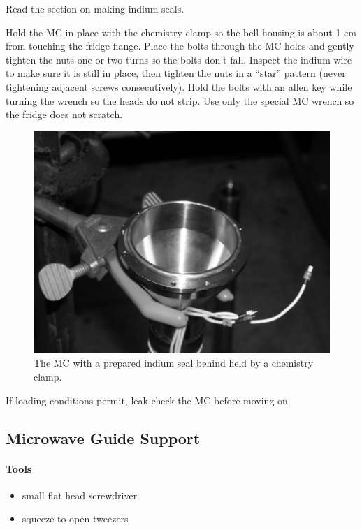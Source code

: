 Read the section on making indium seals.

Hold the MC in place with the chemistry clamp so the bell housing is about 1 cm from touching the fridge flange.  Place the bolts through the MC holes and gently tighten the nuts one or two turns so the bolts don't fall.  Inspect the indium wire to make sure it is still in place, then tighten the nuts in a ``star'' pattern (never tightening adjacent screws consecutively).  Hold the bolts with an allen key while turning the wrench so the heads do not strip.  Use only the special MC wrench so the fridge does not scratch.

\begin{figure}
 \centering
 \includegraphics[scale=.75]{img/mc-stand.jpg}
 \caption{The MC with a prepared indium seal behind held by a chemistry clamp.}
 \label{fig:mc-stand}
\end{figure}


If loading conditions permit, leak check the MC before moving on.

  \subsection{Microwave Guide Support}
\paragraph{Tools}
\begin{itemize}
 \item small flat head screwdriver
\item squeeze-to-open tweezers
\end{itemize}

